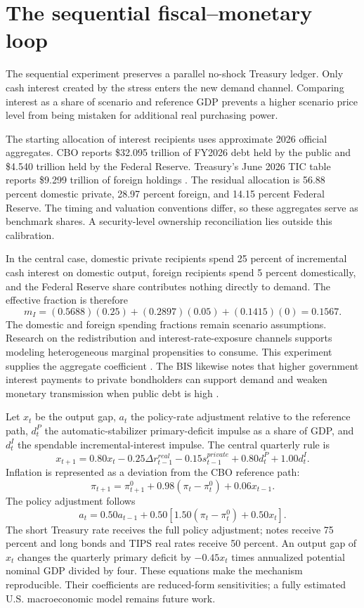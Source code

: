 \documentclass[11pt]{article}
\begin{document}
\FloatBarrier

\section{The sequential fiscal--monetary loop}

The sequential experiment preserves a parallel no-shock Treasury ledger.  Only cash
interest created by the stress enters the new demand channel.  Comparing interest as a
share of scenario and reference GDP prevents a higher scenario price level from being
mistaken for additional real purchasing power.

The starting allocation of interest recipients uses approximate 2026 official aggregates.
CBO reports \$32.095 trillion of FY2026 debt held by the public and \$4.540 trillion held by
the Federal Reserve.  Treasury's June 2026 TIC table reports \$9.299 trillion of foreign
holdings \cite{tic}.  The residual allocation is 56.88 percent domestic private, 28.97
percent foreign, and 14.15 percent Federal Reserve.  The timing and valuation conventions
differ, so these aggregates serve as benchmark shares.  A security-level ownership
reconciliation lies outside this calibration.

In the central case, domestic private recipients spend 25 percent of incremental cash
interest on domestic output, foreign recipients spend 5 percent domestically, and the
Federal Reserve share contributes nothing directly to demand.  The effective fraction is
therefore
\[
m_I=(0.5688)(0.25)+(0.2897)(0.05)+(0.1415)(0)=0.1567.
\]
The domestic and foreign spending fractions remain scenario assumptions.  Research on the
redistribution and interest-rate-exposure channels supports modeling heterogeneous marginal
propensities to consume.  This experiment supplies the aggregate coefficient \cite{auclert}.
The BIS likewise notes that higher government interest payments
to private bondholders can support demand and weaken monetary transmission when public debt
is high \cite{bisDebt2026}.

Let $x_t$ be the output gap, $a_t$ the policy-rate adjustment relative to the reference path,
$d^P_t$ the automatic-stabilizer primary-deficit impulse as a share of GDP, and $d^I_t$ the
spendable incremental-interest impulse.  The central quarterly rule is
\[
x_{t+1}=0.80x_t-0.25\Delta r^{real}_{t-1}-0.15s^{private}_{t-1}
        +0.80d^P_t+1.00d^I_t.
\]
Inflation is represented as a deviation from the CBO reference path:
\[
\pi_{t+1}=\pi^0_{t+1}+0.98(\pi_t-\pi^0_t)+0.06x_{t-1}.
\]
The policy adjustment follows
\[
a_t=0.50a_{t-1}+0.50\left[1.50(\pi_t-\pi^0_t)+0.50x_t\right].
\]
The short Treasury rate receives the full policy adjustment; notes receive 75 percent and
long bonds and TIPS real rates receive 50 percent.  An output gap of $x_t$ changes the
quarterly primary deficit by $-0.45x_t$ times annualized potential nominal GDP divided by
four.  These equations make the mechanism reproducible.  Their coefficients are reduced-form
sensitivities; a fully estimated U.S. macroeconomic model remains future work.
\end{document}
